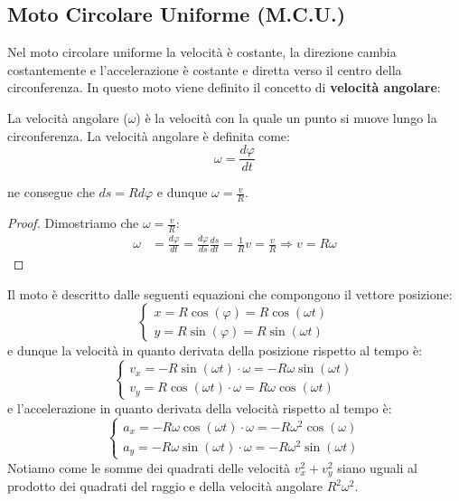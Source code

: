     \subsection{Moto Circolare Uniforme (M.C.U.)}
        Nel moto circolare uniforme la velocità è costante, la direzione cambia costantemente e l'accelerazione è costante e diretta verso il centro della circonferenza. In questo moto viene definito il concetto di \textbf{velocità angolare}:
        \begin{definition}
            La velocità angolare ($\omega$) è la velocità con la quale un punto si muove lungo la circonferenza. La velocità angolare è definita come:
            $$
                \omega = \frac{d\varphi}{dt}
            $$
        \end{definition}
        ne consegue che $ds=Rd\varphi$ e dunque $\omega=\frac{v}{R}$.
        \begin{proof}
            Dimostriamo che $\omega=\frac{v}{R}$:
            $$
                \begin{aligned}
                    \omega &= \frac{d\varphi}{dt} = \frac{d\varphi}{ds}\frac{ds}{dt} = \frac{1}{R}v = \frac{v}{R} \Rightarrow v = R\omega
                \end{aligned}
            $$
        \end{proof}
        Il moto è descritto dalle seguenti equazioni che compongono il vettore posizione:
        $$
            \begin{cases}
                x=R\cos(\varphi)= R\cos(\omega t)\\
                y=R\sin(\varphi)= R\sin(\omega t)
            \end{cases}
        $$
        e dunque la velocità in quanto derivata della posizione rispetto al tempo è:
        $$
            \begin{cases}
                v_x = -R\sin(\omega t)\cdot \omega = -R\omega\sin(\omega t)\\
                v_y = R\cos(\omega t)\cdot \omega = R\omega\cos(\omega t)
            \end{cases}
        $$
        e l'accelerazione in quanto derivata della velocità rispetto al tempo è:
        $$
            \begin{cases}
                a_x = -R\omega\cos(\omega t)\cdot \omega = -R\omega^2\cos(\omega)\\
                a_y = -R\omega\sin(\omega t)\cdot \omega = -R\omega^2\sin(\omega t)
            \end{cases}
        $$
        Notiamo come le somme dei quadrati delle velocità $v_x^2+v_y^2$ siano uguali al prodotto dei quadrati del raggio e della velocità angolare $R^2\omega^2$.\newline
